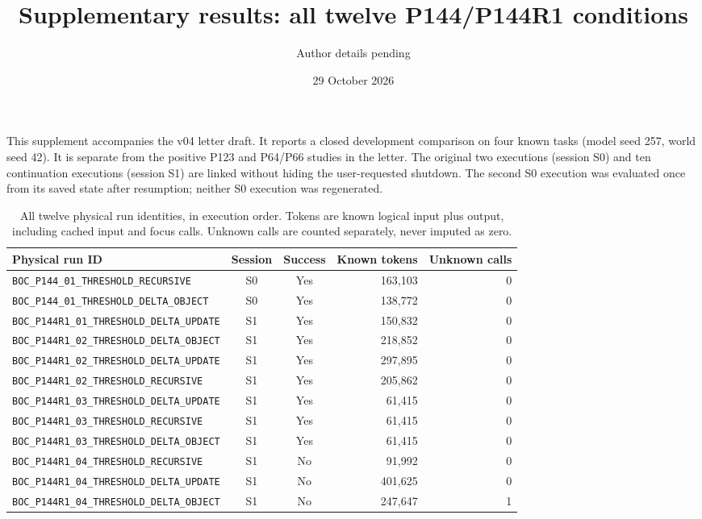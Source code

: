 \documentclass[a4paper,10pt]{article}
\title{Supplementary results: all twelve P144/P144R1 conditions}
\author{Author details pending}
\date{29 October 2026}
\begin{document}
\maketitle
\noindent
This supplement accompanies the v04 letter draft. It reports a closed
development comparison on four known tasks (model seed 257, world seed 42).
It is separate from the positive P123 and P64/P66 studies in the letter.
The original two executions (session S0) and ten continuation executions
(session S1) are linked without hiding the user-requested shutdown.
The second S0 execution was evaluated once from its saved state after resumption;
neither S0 execution was regenerated.

\begin{table}[ht]
\centering
\caption{All twelve physical run identities, in execution order.
Tokens are known logical input plus output, including cached input and focus
calls. Unknown calls are counted separately, never imputed as zero.}
\label{tab:all}
\setlength{\tabcolsep}{4pt}
\small
\begin{tabular}{@{}lccrr@{}}
\toprule
Physical run ID & Session & Success & Known tokens & Unknown calls\\
\midrule
\texttt{BOC\_P144\_01\_THRESHOLD\_RECURSIVE} & S0 & Yes & 163,103 & 0\\
\texttt{BOC\_P144\_01\_THRESHOLD\_DELTA\_OBJECT} & S0 & Yes & 138,772 & 0\\
\texttt{BOC\_P144R1\_01\_THRESHOLD\_DELTA\_UPDATE} & S1 & Yes & 150,832 & 0\\
\texttt{BOC\_P144R1\_02\_THRESHOLD\_DELTA\_OBJECT} & S1 & Yes & 218,852 & 0\\
\texttt{BOC\_P144R1\_02\_THRESHOLD\_DELTA\_UPDATE} & S1 & Yes & 297,895 & 0\\
\texttt{BOC\_P144R1\_02\_THRESHOLD\_RECURSIVE} & S1 & Yes & 205,862 & 0\\
\texttt{BOC\_P144R1\_03\_THRESHOLD\_DELTA\_UPDATE} & S1 & Yes & 61,415 & 0\\
\texttt{BOC\_P144R1\_03\_THRESHOLD\_RECURSIVE} & S1 & Yes & 61,415 & 0\\
\texttt{BOC\_P144R1\_03\_THRESHOLD\_DELTA\_OBJECT} & S1 & Yes & 61,415 & 0\\
\texttt{BOC\_P144R1\_04\_THRESHOLD\_RECURSIVE} & S1 & No & 91,992 & 0\\
\texttt{BOC\_P144R1\_04\_THRESHOLD\_DELTA\_UPDATE} & S1 & No & 401,625 & 0\\
\texttt{BOC\_P144R1\_04\_THRESHOLD\_DELTA\_OBJECT} & S1 & No & 247,647 & 1\\
\bottomrule
\end{tabular}
\end{table}
\end{document}

